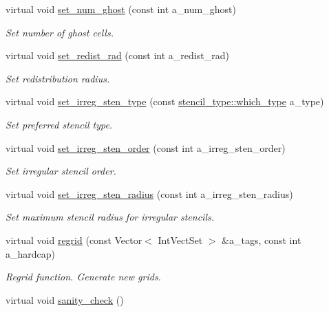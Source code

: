 \begin{DoxyCompactItemize}
virtual void \hyperlink{classamr__mesh_ad450e34dbefa0852935bb5fb8c930b88}{set\+\_\+num\+\_\+ghost} (const int a\+\_\+num\+\_\+ghost)
\begin{DoxyCompactList}\small\item\em Set number of ghost cells. \end{DoxyCompactList}\item 
virtual void \hyperlink{classamr__mesh_ac08b914cd3edae033c7b1881ac2823a7}{set\+\_\+redist\+\_\+rad} (const int a\+\_\+redist\+\_\+rad)
\begin{DoxyCompactList}\small\item\em Set redistribution radius. \end{DoxyCompactList}\item 
virtual void \hyperlink{classamr__mesh_ab62e4c805c0aaa63a53c579f96686ba4}{set\+\_\+irreg\+\_\+sten\+\_\+type} (const \hyperlink{namespacestencil__type_a1ffed19935b7289b50e8dcc017ee99c8}{stencil\+\_\+type\+::which\+\_\+type} a\+\_\+type)
\begin{DoxyCompactList}\small\item\em Set preferred stencil type. \end{DoxyCompactList}\item 
virtual void \hyperlink{classamr__mesh_ad3aba1f14fc0e42d98d9a3545d751b85}{set\+\_\+irreg\+\_\+sten\+\_\+order} (const int a\+\_\+irreg\+\_\+sten\+\_\+order)
\begin{DoxyCompactList}\small\item\em Set irregular stencil order. \end{DoxyCompactList}\item 
virtual void \hyperlink{classamr__mesh_a3df214d03734bf5118da6e283cb24b1d}{set\+\_\+irreg\+\_\+sten\+\_\+radius} (const int a\+\_\+irreg\+\_\+sten\+\_\+radius)
\begin{DoxyCompactList}\small\item\em Set maximum stencil radius for irregular stencils. \end{DoxyCompactList}\item 
virtual void \hyperlink{classamr__mesh_a5cef6ce665ff644659586b79e178b2df}{regrid} (const Vector$<$ Int\+Vect\+Set $>$ \&a\+\_\+tags, const int a\+\_\+hardcap)
\begin{DoxyCompactList}\small\item\em Regrid function. Generate new grids. \end{DoxyCompactList}\item 
virtual void \hyperlink{classamr__mesh_a8a76c5a1896d2477eb2c1578bd08527a}{sanity\+\_\+check} ()

\end{DoxyCompactItemize}
